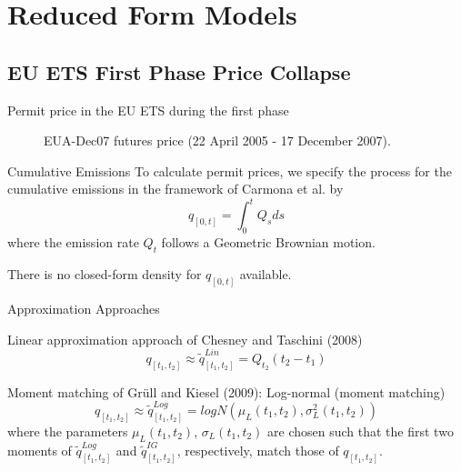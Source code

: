 \section{Reduced Form Models}
\subsection{EU ETS First Phase Price Collapse}

{Permit price in the EU ETS during the first phase}
\begin{center}
\begin{figure}[h!]
\centering
{}
\caption{EUA-Dec07 futures price (22 April 2005 - 17 December 2007).}
\label{fig:plotCar00-Data}
\end{figure}
\end{center}


{Cumulative Emissions}
    To calculate permit prices, we specify the process for the cumulative emissions in the framework of Carmona et al. by
    $$
      q_{[0,t]} = \int_0^t Q_s ds
    $$
    where the emission rate $Q_t$ follows a Geometric Brownian motion.

  There is no closed-form density for $q_{[0,t]}$ available.


{Approximation Approaches}


	Linear approximation approach of Chesney and Taschini (2008)
   $$
     q_{[t_1,t_2]} \approx \tilde{q}^{Lin}_{[t_1,t_2]} = Q_{t_2} (t_2 - t_1)
   $$

	Moment matching of Gr{\"u}ll and Kiesel (2009): Log-normal (moment matching)
$$
q_{[t_1,t_2]} \approx \tilde{q}^{Log}_{[t_1,t_2]} = logN \left(\mu_L(t_1,t_2), \sigma^2_L(t_1,t_2) \right) \label{ECumApprox2}
$$
where the parameters $\mu_L(t_1,t_2)$, $\sigma_L(t_1,t_2)$ are chosen such that the first two moments of $\tilde{q}^{Log}_{[t_1,t_2]}$ and $\tilde{q}^{IG}_{[t_1,t_2]}$, respectively, match those of $q_{[t_1,t_2]}$.

